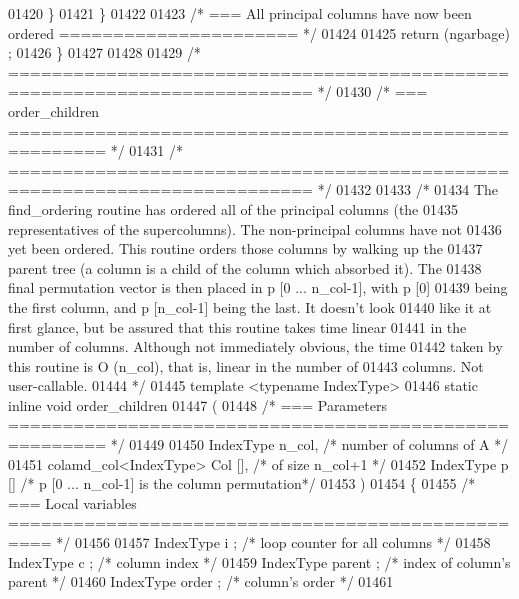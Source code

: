 \begin{DoxyCode}
{{{{{{{{{{{{{{{{{{{{{{{{{{{{01420     \}
01421   \}
01422 
01423   \textcolor{comment}{/* === All principal columns have now been ordered ====================== */}
01424 
01425   \textcolor{keywordflow}{return} (ngarbage) ;
01426 \}
01427 
01428 
01429 \textcolor{comment}{/* ========================================================================== */}
01430 \textcolor{comment}{/* === order\_children ======================================================= */}
01431 \textcolor{comment}{/* ========================================================================== */}
01432 
01433 \textcolor{comment}{/*}
01434 \textcolor{comment}{  The find\_ordering routine has ordered all of the principal columns (the}
01435 \textcolor{comment}{  representatives of the supercolumns).  The non-principal columns have not}
01436 \textcolor{comment}{  yet been ordered.  This routine orders those columns by walking up the}
01437 \textcolor{comment}{  parent tree (a column is a child of the column which absorbed it).  The}
01438 \textcolor{comment}{  final permutation vector is then placed in p [0 ... n\_col-1], with p [0]}
01439 \textcolor{comment}{  being the first column, and p [n\_col-1] being the last.  It doesn't look}
01440 \textcolor{comment}{  like it at first glance, but be assured that this routine takes time linear}
01441 \textcolor{comment}{  in the number of columns.  Although not immediately obvious, the time}
01442 \textcolor{comment}{  taken by this routine is O (n\_col), that is, linear in the number of}
01443 \textcolor{comment}{  columns.  Not user-callable.}
01444 \textcolor{comment}{*/}
01445 \textcolor{keyword}{template} <\textcolor{keyword}{typename} IndexType>
01446 \textcolor{keyword}{static} \textcolor{keyword}{inline}  \textcolor{keywordtype}{void} order\_children
01447 (
01448   \textcolor{comment}{/* === Parameters ======================================================= */}
01449 
01450   IndexType n\_col,      \textcolor{comment}{/* number of columns of A */}
01451   colamd\_col<IndexType> Col [],    \textcolor{comment}{/* of size n\_col+1 */}
01452   IndexType p []      \textcolor{comment}{/* p [0 ... n\_col-1] is the column permutation*/}
01453   )
01454 \{
01455   \textcolor{comment}{/* === Local variables ================================================== */}
01456 
01457   IndexType i ;     \textcolor{comment}{/* loop counter for all columns */}
01458   IndexType c ;     \textcolor{comment}{/* column index */}
01459   IndexType parent ;    \textcolor{comment}{/* index of column's parent */}
01460   IndexType order ;     \textcolor{comment}{/* column's order */}
01461 
}}}}}}}}}}}}}}}}}}}}}}}}}}}}
\end{DoxyCode}
